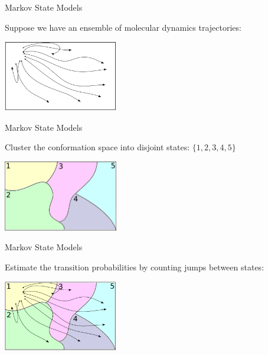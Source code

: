 \documentclass[10pt]{beamer}
\begin{document}
\begin{frame}{Markov State Models}

Suppose we have an ensemble of molecular dynamics trajectories: 

\begin{center}
\includegraphics[width=50mm]{Figures/NewPaths2}
\end{center}

\end{frame}

\begin{frame}{Markov State Models}
 
Cluster the conformation space into disjoint states: $\{1,2,3,4,5\}$
\vspace{4mm}
\begin{center}
\includegraphics[width=50mm]{Figures/Paths-Clusters}
\end{center}


\end{frame}

\begin{frame}{Markov State Models}
 
Estimate the transition probabilities by counting jumps between states:

\vspace{4mm}
\begin{center}
\includegraphics[width=50mm]{Figures/NewPaths3}
\end{center}


\end{frame}
\end{document}
